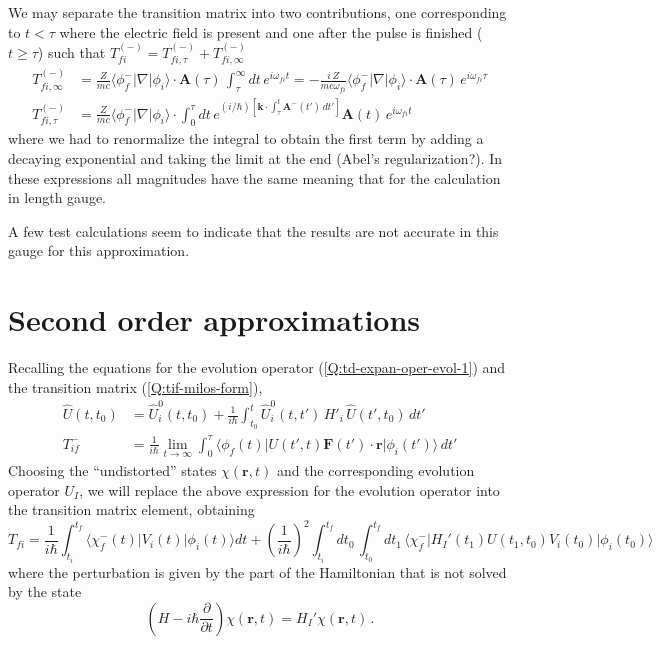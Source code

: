 We may separate the transition matrix into two contributions, one corresponding to $t<\tau$ where the electric field is present and one after the pulse is finished ($t \ge \tau$) such that $T_{fi}^{(-)}= T_{fi,\tau}^{(-)} + T_{fi,\infty}^{(-)}$
\begin{align*}
  T_{fi,\infty}^{(-)} &= \frac{Z}{m c} \langle \phi^{-}_{f} | \nabla | \phi_{i} \rangle \cdot \bm{A}(\tau) \,  \int_{\tau}^{\infty} dt \, e^{i \omega_{fi} t } = -\frac{i \, Z}{m c \omega_{fi}} \langle \phi^{-}_{f} | \nabla | \phi_{i} \rangle \cdot \bm{A}(\tau) \, e^{i \omega_{fi} \tau} \\
  T_{fi,\tau}^{(-)} &= \frac{Z}{m c} \langle \phi^{-}_{f} | \nabla | \phi_{i} \rangle \cdot  \int_{0}^{\tau} dt \, e^{(i/\hbar) \left[ \bm{k} \cdot \int_{\tau}^{t}  \bm{A}^{-}(t')\, dt' \right]  } \bm{A}(t) \,  e^{i \omega_{fi} t }
\end{align*} 
where we had to renormalize the integral to obtain the first term by adding a decaying exponential and taking the limit at the end (Abel's regularization?). In these expressions all magnitudes have the same meaning that for the calculation in length gauge.

\begin{bfseries}
A few test calculations seem to indicate that the results are not accurate in this gauge for this approximation.
\end{bfseries}

\section{Second order approximations}
\label{S:second-order-appr}
Recalling the equations for the evolution operator (\ref{Q:td-expan-oper-evol-1}) and the transition matrix (\ref{Q:tif-milos-form}), 
\begin{align*}
  \hat{U}(t,t_{0}) &= \hat{U}^{0}_{i}(t,t_{0}) + \frac{1}{i\hbar} \int_{t_{0}}^{t} \hat{U}^{0}_{i}(t,t')\, H'_{i} \, \hat{U}(t',t_{0}) \, dt'  \\
  T_{if}^{-}  &= \frac{1}{i \hbar} \lim_{t \to \infty} \int_{0}^{\tau} \big\langle \phi_{f}(t) \big| U(t',t)  \bm{F}(t')\cdot \bm{r} \big| \phi_{i}(t') \big\rangle \, dt'
\end{align*}
Choosing the ``undistorted'' states $\chi (\bm{r},t)$ and the corresponding evolution operator $U_{I}$, we will replace the above expression for the evolution operator into the transition matrix element, obtaining 
\begin{equation}\label{Q:CV-2or-0}
T_{fi} = \frac{1}{i\hbar} \int_{t_{i}}^{t_{f}} \big\langle \chi_{f}^{-}(t)|V_{i}(t)|\phi_{i}(t) \big\rangle dt +  \left( \frac{1}{i \hbar} \right)^{2} \int_{t_{i}}^{t_{f}} d t_{0} \, \int_{t_{0}}^{t_{f}} d t_{1} \,\Big\langle \chi_{f}^{-} \Big| H_{I}'(t_{1}) U(t_{1},t_{0}) V_{i}(t_{0}) \Big| \phi_{i}(t_{0}) \Big\rangle
\end{equation}
where the perturbation is given by the part of the Hamiltonian that is not solved by the state
\begin{equation}\label{Q:CV-def-perturb-0}
  \left( H - i \hbar \frac{\partial }{\partial t} \right) \chi (\bm{r},t) = H_{I}' \chi (\bm{r},t) \, .
\end{equation}

